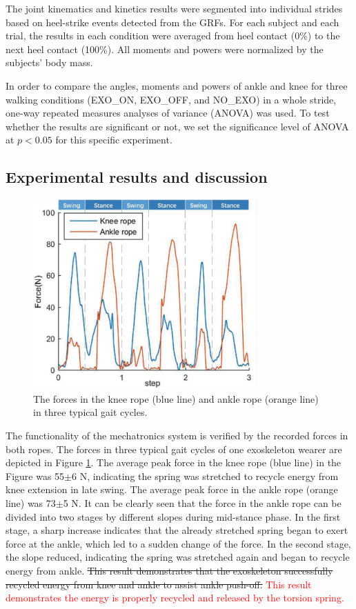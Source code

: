 \documentclass[twocolumn,cleanfoot,10pt]{asme2ej}
\begin{document}
The joint kinematics and kinetics results were segmented into individual strides based on heel-strike events detected from the GRFs.
For each subject and each trial, the results in each condition were averaged from heel contact (0\%) to the next heel contact (100\%). All moments and powers were normalized by the subjects’ body mass.

In order to compare the angles, moments and powers of ankle and knee for three walking conditions (EXO\_ON, EXO\_OFF, and NO\_EXO) in a whole stride, one-way repeated measures analyses of variance (ANOVA) was used.
To test whether the results are significant or not, we set the significance level of ANOVA at $p<0.05$ for this specific experiment. 

\subsection{Experimental results and discussion}

\begin{figure}[b]
	\centering
	\includegraphics[width=8.5cm]{forces.eps}
	\caption{The forces in the knee rope (blue line) and ankle rope (orange line) in three typical gait cycles.}
	\label{fig:force}
\end{figure}

The functionality of the mechatronics system is verified by the recorded forces in both ropes.
The forces in three typical gait cycles of one exoskeleton wearer are depicted in Figure \ref{fig:force}.
The average peak force in the knee rope (blue line) in the Figure was 55$\pm$6 N, indicating the spring was stretched to recycle energy from knee extension in late swing.
The average peak force in the ankle rope (orange line) was 73$\pm$5 N.
It can be clearly seen that the force in the ankle rope can be divided into two stages by different slopes during mid-stance phase.
In the first stage, a sharp increase indicates that the already stretched spring began to exert force at the ankle, which led to a sudden change of the force.
In the second stage, the slope reduced, indicating the spring was stretched again and began to recycle energy from ankle.
\sout{This result demonstrates that the exoskeleton successfully recycled energy from knee and ankle to assist ankle push-off.}
\textcolor{red}{This result demonstrates the energy is properly recycled and released by the torsion spring.}
\end{document}
